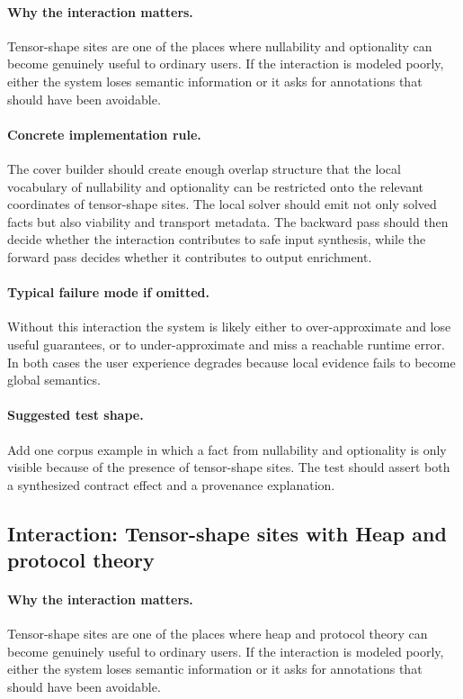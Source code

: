 \documentclass[11pt]{report}
\theoremstyle{definition}
\theoremstyle{plain}
\begin{document}
\paragraph{Why the interaction matters.}
Tensor-shape sites are one of the places where nullability and optionality can become
genuinely useful to ordinary users. If the interaction is modeled poorly,
either the system loses semantic information or it asks for annotations that
should have been avoidable.

\paragraph{Concrete implementation rule.}
The cover builder should create enough overlap structure that the local
vocabulary of nullability and optionality can be restricted onto the relevant
coordinates of tensor-shape sites. The local solver should emit not only
solved facts but also viability and transport metadata. The backward pass
should then decide whether the interaction contributes to safe input
synthesis, while the forward pass decides whether it contributes to output
enrichment.

\paragraph{Typical failure mode if omitted.}
Without this interaction the system is likely either to over-approximate and
lose useful guarantees, or to under-approximate and miss a reachable runtime
error. In both cases the user experience degrades because local evidence
fails to become global semantics.

\paragraph{Suggested test shape.}
Add one corpus example in which a fact from nullability and optionality is only
visible because of the presence of tensor-shape sites. The test should
assert both a synthesized contract effect and a provenance explanation.

\subsection{Interaction: Tensor-shape sites with Heap and protocol theory}

\paragraph{Why the interaction matters.}
Tensor-shape sites are one of the places where heap and protocol theory can become
genuinely useful to ordinary users. If the interaction is modeled poorly,
either the system loses semantic information or it asks for annotations that
should have been avoidable.
\end{document}

